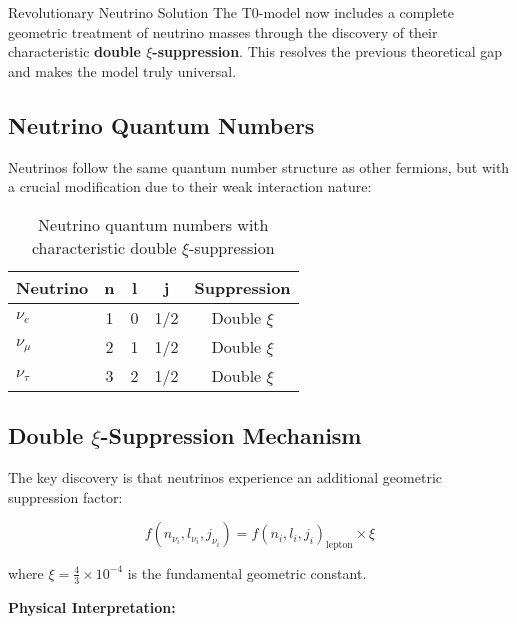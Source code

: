\documentclass[12pt,a4paper]{article}
\begin{document}
	\begin{neutrino}{Revolutionary Neutrino Solution}{}
		The T0-model now includes a complete geometric treatment of neutrino masses through the discovery of their characteristic \textbf{double $\xi$-suppression}. This resolves the previous theoretical gap and makes the model truly universal.
	\end{neutrino}
	
	\subsection{Neutrino Quantum Numbers}
	\label{subsec:neutrino_quantum_numbers}
	
	Neutrinos follow the same quantum number structure as other fermions, but with a crucial modification due to their weak interaction nature:
	
	\begin{table}[H]
		\centering
		\begin{tabular}{lcccc}
			\toprule
			\textbf{Neutrino} & \textbf{n} & \textbf{l} & \textbf{j} & \textbf{Suppression} \\
			\midrule
			$\nu_e$ & 1 & 0 & 1/2 & Double $\xi$ \\
			$\nu_\mu$ & 2 & 1 & 1/2 & Double $\xi$ \\
			$\nu_\tau$ & 3 & 2 & 1/2 & Double $\xi$ \\
			\bottomrule
		\end{tabular}
		\caption{Neutrino quantum numbers with characteristic double $\xi$-suppression}
		\label{tab:neutrino_quantum_numbers}
	\end{table}
	
	\subsection{Double $\xi$-Suppression Mechanism}
	\label{subsec:double_xi_suppression}
	
	The key discovery is that neutrinos experience an additional geometric suppression factor:
	
	\begin{equation}
		f(n_{\nu_i}, l_{\nu_i}, j_{\nu_i}) = f(n_i, l_i, j_i)_{\text{lepton}} \times \xi
		\label{eq:neutrino_suppression}
	\end{equation}
	
	where $\xi = \frac{4}{3} \times 10^{-4}$ is the fundamental geometric constant.
	
	\textbf{Physical Interpretation:}
	
\end{document}
